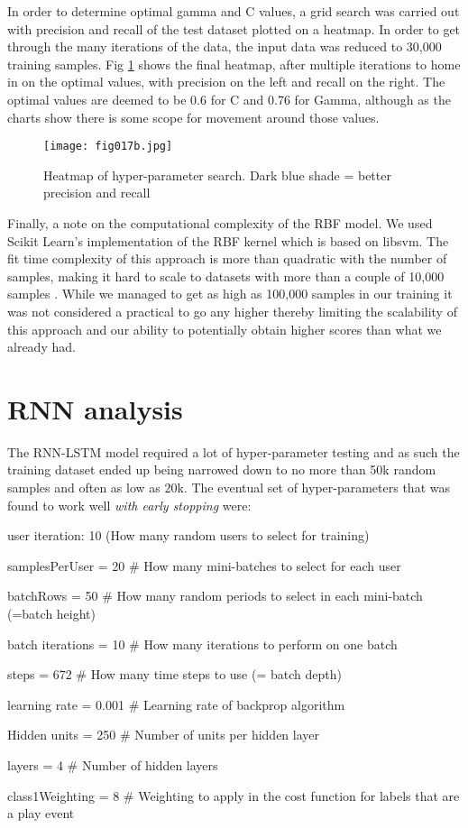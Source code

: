 In order to determine optimal gamma and C values, a grid search was carried out with precision and recall of the test dataset plotted on a heatmap. In order to get through the many iterations of the data, the input data was reduced to 30,000 training samples. Fig \ref{fig17b} shows the final heatmap, after multiple iterations to home in on the optimal values, with precision on the left and recall on the right. The optimal values are deemed to be 0.6 for C and 0.76 for Gamma, although as the charts show there is some scope for movement around those values.

\begin{figure}[h!]
	\centering
	\texttt{[image: fig017b.jpg]}
	\caption{Heatmap of hyper-parameter search. Dark blue shade = better precision and recall}
	\label{fig17b}
\end{figure} 

Finally, a note on the computational complexity of the RBF model. We used Scikit Learn's implementation of the RBF kernel which is based on libsvm. The fit time complexity of this approach is more than quadratic with the number of samples, making it hard to scale to datasets with more than a couple of 10,000 samples \parencite{chang2011libsvm}.
While we managed to get as high as 100,000 samples in our training it was not considered a practical to go any higher thereby limiting the scalability of this approach and our ability to potentially obtain higher scores than what we already had.

\section{RNN analysis}

The RNN-LSTM model required a lot of hyper-parameter testing and as such the training dataset ended up being narrowed down to no more than 50k random samples and often as low as 20k. The eventual set of hyper-parameters that was found to work well \textit{with early stopping} were:

\begin{list}{-}{spacing}
	\item user iteration: 10 (How many random users to select for training)
	\item samplesPerUser = 20      \# How many mini-batches to select for each user
	\item batchRows = 50           \# How many random periods to select in each mini-batch (=batch height)
	\item batch iterations = 10    \# How many iterations to perform on one batch
	\item steps = 672              \# How many time steps to use (= batch depth)
	\item learning rate = 0.001    \# Learning rate of backprop algorithm
	\item Hidden units = 250       \# Number of units per hidden layer
	\item layers = 4			   \# Number of hidden layers
	\item class1Weighting = 8      \# Weighting to apply in the cost function for labels that are a play event
\end{list}

